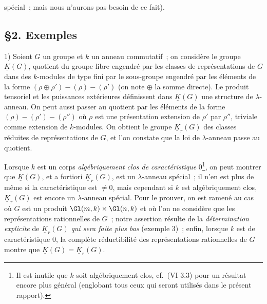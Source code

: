 spécial~; mais nous n'aurons pas besoin de ce fait).

\subsection*{\S 2. Exemples}

1) Soient $G$ un groupe et $k$ un anneau commutatif~; on considère le groupe $\underline{K}(G)$, quotient du groupe libre engendré par les classes de représentations de $G$ dans des $k$-modules de type fini par le sous-groupe engendré par les éléments de la forme $(\rho\oplus\rho')-(\rho)-(\rho')$ (on note $\oplus$ la somme directe). Le produit tensoriel et les puissances extérieures définissent dans $\underline{K}(G)$ une structure de $\lambda$-anneau. On peut aussi passer au quotient par les éléments de la forme $(\rho)-(\rho')-(\rho'')$ où $\rho$ est une présentation extension de $\rho'$ par $\rho''$, triviale comme extension de $k$-modules. On obtient le groupe $\underline{K}_r(G)$ des classes réduites de représentations de $G$, et l'on constate que la loi de $\lambda$-anneau passe au quotient.

Lorsque $k$ est un corps \emph{algébriquement clos de caractéristique} $0$\footnote{Il est inutile que $k$ soit algébriquement clos, cf.\ (VI 3.3) pour un résultat encore plus général (englobant tous ceux qui seront utilisés dans le présent rapport).}, on peut montrer que $\underline{K}(G)$, et a fortiori $\underline{K}_r(G)$, est un $\lambda$-anneau spécial~; il n'en est plus de même si la caractéristique est $\neq 0$, mais cependant si $k$ est algébriquement clos, $\underline{K}_r(G)$ est encore un $\lambda$-anneau spécial. Pour le prouver, on est ramené au cas où $G$ est un produit $\Gl(m,k)\times\Gl(n,k)$ et où l'on ne considère que les représentations rationnelles de $G$~; notre assertion résulte de la \emph{détermination explicite} de $\underline{K}_r(G)$ \emph{qui sera faite plus bas} (exemple 3)~; enfin, lorsque $k$ est de caractéristique $0$, la complète réductibilité des représentations rationnelles de $G$ montre que $\underline{K}(G)=\underline{K}_r(G)$.

